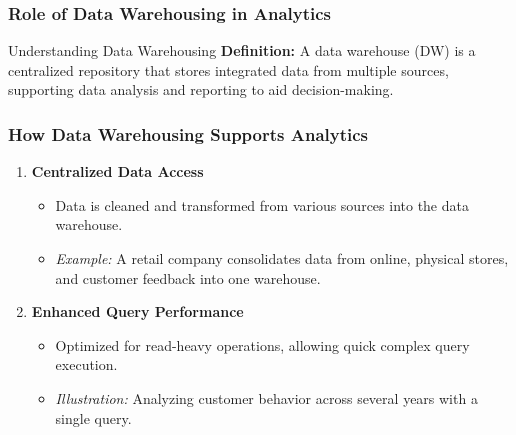 \documentclass{beamer}
\begin{document}
\begin{frame}[fragile]
    \frametitle{Role of Data Warehousing in Analytics}
    \begin{block}{Understanding Data Warehousing}
        \textbf{Definition:} A data warehouse (DW) is a centralized repository that stores integrated data from multiple sources, supporting data analysis and reporting to aid decision-making.
    \end{block}
\end{frame}

\begin{frame}[fragile]
    \frametitle{How Data Warehousing Supports Analytics}
    \begin{enumerate}
        \item \textbf{Centralized Data Access}
        \begin{itemize}
            \item Data is cleaned and transformed from various sources into the data warehouse.
            \item \textit{Example:} A retail company consolidates data from online, physical stores, and customer feedback into one warehouse.
        \end{itemize}
        
        \item \textbf{Enhanced Query Performance}
        \begin{itemize}
            \item Optimized for read-heavy operations, allowing quick complex query execution.
            \item \textit{Illustration:} Analyzing customer behavior across several years with a single query.
        \end{itemize}
    \end{enumerate}
\end{frame}
\end{document}
